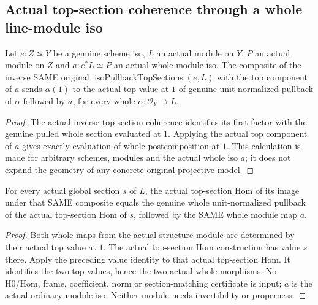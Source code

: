 \subsection{Actual top-section coherence through a whole line-module iso}
\begin{theorem}
\label{thm:seven-iso-line-top-section-value-coherence}
\leanok
Let $e:Z\simeq Y$ be a genuine scheme iso, $L$ an actual module on
$Y$, $P$ an actual module on $Z$ and $a:e^*L\simeq P$ an actual
whole module iso. The composite of the inverse SAME original
$\operatorname{isoPullbackTopSections}(e,L)$ with the top component of
$a$ sends $\alpha(1)$ to the actual top value at $1$ of genuine
unit-normalized pullback of $\alpha$ followed by $a$, for every whole
$\alpha:\mathcal O_Y\to L$.
\end{theorem}
\begin{proof}
The actual inverse top-section coherence identifies its first factor
with the genuine pulled whole section evaluated at $1$. Applying the
actual top component of $a$ gives exactly evaluation of whole
postcomposition at $1$. This calculation is made for arbitrary
schemes, modules and the actual whole iso $a$; it does not expand the
geometry of any concrete original projective model.
\end{proof}
\begin{theorem}
\label{thm:seven-iso-line-top-section-hom-coherence}
\leanok
For every actual global section $s$ of $L$, the actual top-section Hom
of its image under that SAME composite equals the genuine whole
unit-normalized pullback of the actual top-section Hom of $s$, followed
by the SAME whole module map $a$.
\end{theorem}
\begin{proof}
Both whole maps from the actual structure module are determined by
their actual top value at $1$. The actual top-section Hom construction
has value $s$ there. Apply the preceding value identity to that
actual top-section Hom. It identifies the two top values, hence the
two actual whole morphisms. No H0/Hom, frame, coefficient, norm or
section-matching certificate is input; $a$ is the actual ordinary
module iso. Neither module needs invertibility or properness.
\end{proof}

